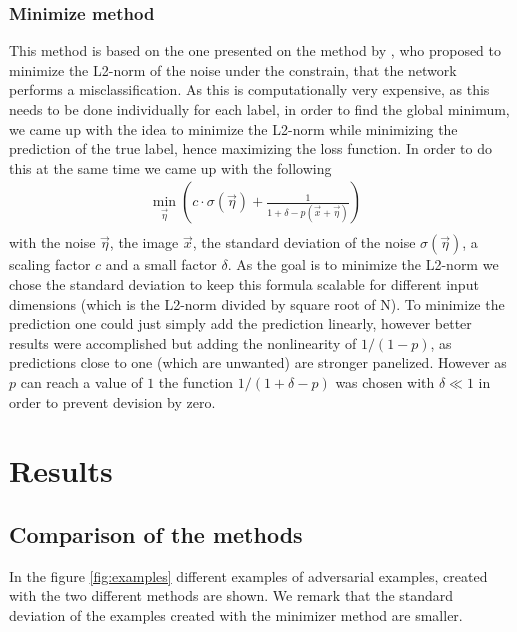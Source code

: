 \documentclass[%
 reprint,
 amsmath,amssymb,
 aps,
]{revtex4-1}
\begin{document}
\subsubsection*{Minimize method}
This method is based on the one presented on the method by \citeauthor{paperMinimize}, who proposed to minimize the L2-norm of the noise under the constrain, that the network performs a misclassification. As this is computationally very expensive, as this needs to be done individually for each label, in order to find the global minimum, we came up with the idea to minimize the L2-norm while minimizing the prediction of the true label, hence maximizing the loss function. In order to do this at the same time we came up with the following
\begin{align*}
\min_{\vec{\eta}} \left( c \cdot \sigma(\vec{\eta}) + \frac{1}{1 + \delta - p(\vec{x}+\vec{\eta})} \right) & \\
\end{align*}
with the noise $\vec{\eta}$, the image $\vec{x}$, the standard deviation of the noise $\sigma (\vec{\eta})$, a scaling factor $c$ and a small factor $\delta$. As the goal is to minimize the L2-norm we chose the standard deviation to keep this formula scalable for different input dimensions (which is the L2-norm divided by square root of N). To minimize the prediction one could just simply add the prediction linearly, however better results were accomplished but adding the nonlinearity of $1/(1-p)$, as predictions close to one (which are unwanted) are stronger panelized. However as $p$ can reach a value of $1$ the function $1/(1 + \delta - p)$ was chosen with $\delta \ll 1$ in order to prevent devision by zero.

\section{Results}

\subsection{Comparison of the methods}

In the figure \ref{fig:examples} different examples of adversarial examples, created with the two different methods are shown. We remark that the standard deviation of the examples created with the minimizer method are smaller.
\end{document}
